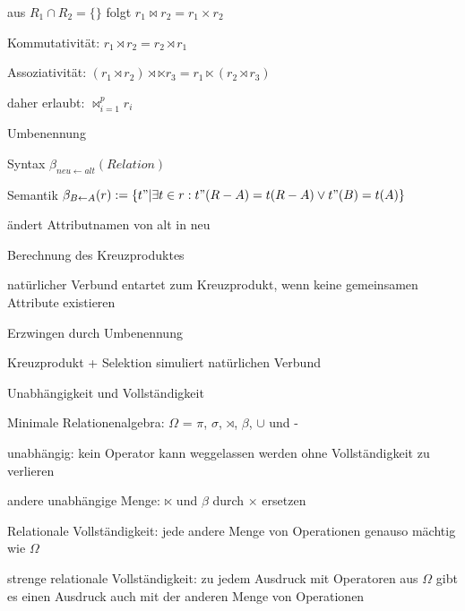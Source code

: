 \documentclass[a4paper]{article}
\begin{document}
\begin{multicols}{3}
\begin{itemize*}
\begin{itemize*}
            \item aus $R_1 \cap R_2 = \{\}$ folgt $r_1\bowtie r_2 = r_1 \times r_2$
            \item Kommutativität: $r_1 \rtimes r_2 = r_2 \rtimes r_1$
            \item Assoziativität: $(r_1 \rtimes r_2 ) \rtimes \ltimes r_3 = r_1 \ltimes (r_2 \rtimes r_3 )$
            \item daher erlaubt: $\bowtie_{i=1}^p r_i$
        \end{itemize*}
        \item Umbenennung
        \begin{itemize*}
            \item Syntax $\beta_{neu\leftarrow alt} (Relation)$
            \item Semantik $\beta_{B\leftarrow A} (r) := \{t" | \exists t \in r : t" (R-A) = t(R-A) \vee t"(B) = t(A)\}$
            \item ändert Attributnamen von alt in neu
        \end{itemize*}
        \item Berechnung des Kreuzproduktes
        \begin{itemize*}
            \item natürlicher Verbund entartet zum Kreuzprodukt, wenn keine gemeinsamen Attribute existieren
            \item Erzwingen durch Umbenennung
            \item Kreuzprodukt + Selektion simuliert natürlichen Verbund
        \end{itemize*}
    \end{itemize*}

    Unabhängigkeit und Vollständigkeit
    \begin{itemize*}
        \item Minimale Relationenalgebra: $\Omega$ = $\pi$, $\sigma$, $\rtimes$, $\beta$, $\cup$ und -
        \item unabhängig: kein Operator kann weggelassen werden ohne Vollständigkeit zu verlieren
        \item andere unabhängige Menge: $\ltimes$ und $\beta$ durch × ersetzen
        \item Relationale Vollständigkeit: jede andere Menge von Operationen genauso mächtig wie $\Omega$
        \item strenge relationale Vollständigkeit: zu jedem Ausdruck mit Operatoren aus $\Omega$ gibt es einen Ausdruck auch mit der anderen Menge von Operationen
    \end{itemize*}


\end{multicols}
\end{document}
